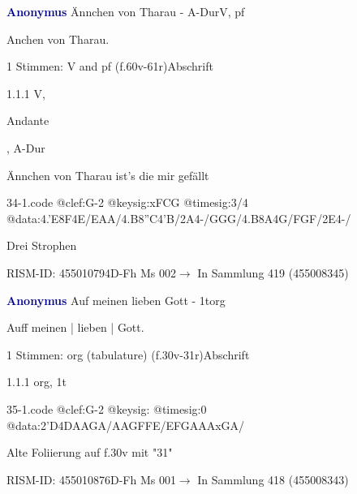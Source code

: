 \documentclass[twocolumn, 12pt]{book}
\begin{document}
\par \vspace{16pt} \textcolor{darkblue}{\textbf{Anonymus  }}\hfillplus{\textbf{[34]}}\newline Ännchen von Tharau - A-Dur\newline V, pf
\par \begin{itshape}[heading, f.60v:] Anchen von Tharau.\end{itshape} 
\par \textcolor{darkblue}{}  1 Stimmen: V and pf  (f.60v-61r)\newline Abschrift
\par 1.1.1  V, \begin{itshape}Andante\end{itshape}, A-Dur\newline \begin{footnotesize} Ännchen von Tharau ist's die mir gefällt \end{footnotesize}  
\begin{filecontents*}{34-1.code}
@clef:G-2
@keysig:xFCG
@timesig:3/4
@data:4.'E8F4E/EAA/4.B8''C4'B/2A4-/GGG/4.B8A4G/FGF/2E4-/
\end{filecontents*}
\newline %
\par Drei Strophen
\par RISM-ID: 455010794\newline D-Fh  Ms 002\newline $\rightarrow$ In Sammlung 419 (455008345)
      
\par \vspace{16pt} \textcolor{darkblue}{\textbf{Anonymus  }}\hfillplus{\textbf{[35]}}\newline Auf meinen lieben Gott - 1t\newline org
\par \begin{itshape}[f.30v, at left:] Auff meinen | lieben | Gott.\end{itshape} 
\par \textcolor{darkblue}{}  1 Stimmen: org (tabulature)  (f.30v-31r)\newline Abschrift
\par 1.1.1  org, 1t  
\begin{filecontents*}{35-1.code}
@clef:G-2
@keysig:
@timesig:0
@data:2'D4DAAGA/AAGFFE/EFGAAAxGA/
\end{filecontents*}
\newline %
\par Alte Foliierung auf f.30v mit "31"
\par RISM-ID: 455010876\newline D-Fh  Ms 001\newline $\rightarrow$ In Sammlung 418 (455008343)
      
\end{document}
